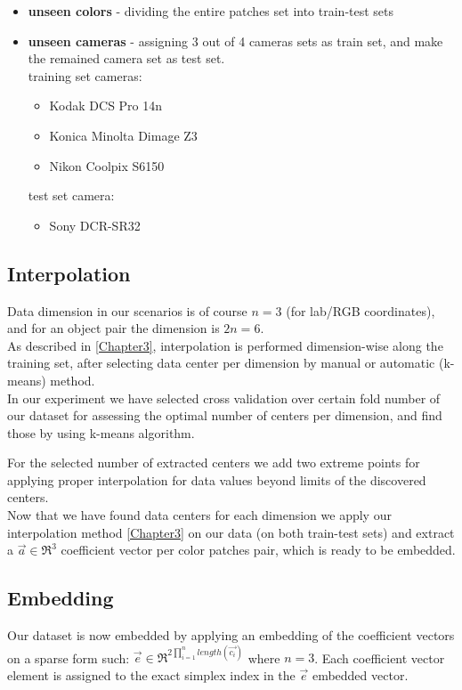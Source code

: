 \begin{itemize}
	\item \textbf{unseen colors} - dividing the entire patches set into train-test sets
	\item \textbf{unseen cameras} - assigning 3 out of 4 cameras sets as train set, and make the remained camera set as test set. \\
		training set cameras:
		\begin{itemize}
			\item Kodak DCS	Pro 14n
			\item Konica Minolta Dimage Z3
			\item Nikon Coolpix S6150
		\end{itemize}	
		
		test set camera:	
		\begin{itemize}
			\item Sony DCR-SR32
		\end{itemize}
		
\end{itemize}

\subsection{Interpolation}
Data dimension in our scenarios is of course $n=3$ (for lab/RGB \cite{RGB} coordinates), and for an object pair the dimension is $2n=6$. \\
As described in \ref{Chapter3}, interpolation is performed dimension-wise along the training set, after selecting data center per dimension by manual or automatic (k-means) method.
\\
In our experiment we have selected cross validation \cite{cross_val} over certain fold number of our dataset for assessing the optimal number of centers per dimension, and find those by using k-means \cite{kmeans} algorithm.





For the selected number of extracted centers we add two extreme points for applying proper interpolation for data values beyond limits of the discovered centers.
\\
Now that we have found data centers for each dimension we apply our interpolation method \ref{Chapter3} on our data (on both train-test sets) and extract a $\overrightarrow{a} \in \Re^3$ coefficient vector per color patches pair, which is ready to be embedded.


\subsection{Embedding}
Our dataset is now embedded by applying an embedding of the coefficient vectors on a sparse form such: 
\vskip5pt
$\overrightarrow{e} \in \Re^{2\prod_{i=1}^{n}{length(\overrightarrow{c_i})}}$ 
\vskip5pt
where $n = 3$.
\vskip5pt
Each coefficient vector element is assigned to the exact simplex index in the $\overrightarrow{e}$ embedded vector.
\\

